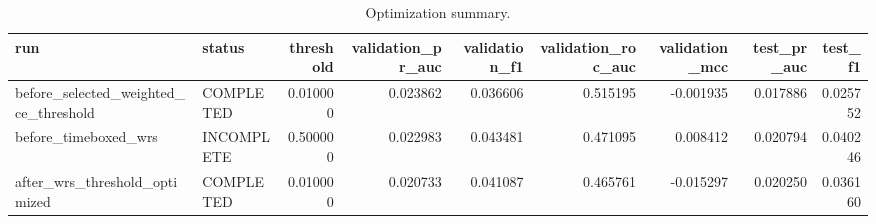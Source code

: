 \begin{table}
\caption{Optimization summary.}
\label{tab:optimization_summary_table}
\begin{tabular}{llrrrrrrr}
\toprule
run & status & threshold & validation\_pr\_auc & validation\_f1 & validation\_roc\_auc & validation\_mcc & test\_pr\_auc & test\_f1 \\
\midrule
before\_selected\_weighted\_ce\_threshold & COMPLETED & 0.010000 & 0.023862 & 0.036606 & 0.515195 & -0.001935 & 0.017886 & 0.025752 \\
before\_timeboxed\_wrs & INCOMPLETE & 0.500000 & 0.022983 & 0.043481 & 0.471095 & 0.008412 & 0.020794 & 0.040246 \\
after\_wrs\_threshold\_optimized & COMPLETED & 0.010000 & 0.020733 & 0.041087 & 0.465761 & -0.015297 & 0.020250 & 0.036160 \\
\bottomrule
\end{tabular}
\end{table}

